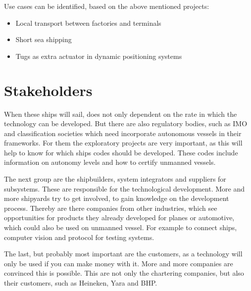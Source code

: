 Use cases can be identified, based on the above mentioned projects:
\begin{itemize}
	\item Local transport between factories and terminals
	\item Short sea shipping
	\item Tugs as extra actuator in dynamic positioning systems
\end{itemize}

\section{Stakeholders}
When these ships will sail, does not only dependent on the rate in which the technology can be developed. But there are also regulatory bodies, such as \ac{IMO} and classification societies which need incorporate autonomous vessels in their frameworks. 
For them the exploratory projects are very important, as this will help to know for which ships codes should be developed. These codes include information on autonomy levels and how to certify unmanned vessels.

The next group are the shipbuilders, system integrators and suppliers for subsystems. These are responsible for the technological development. More and more shipyards try to get involved, to gain knowledge on the development process. 
Thereby are there companies from other industries, which see opportunities for products they already developed for planes or automotive, which could also be used on unmanned vessel. For example to connect ships, computer vision and protocol for testing systems.

The last, but probably most important are the customers, as a technology will only be used if you can make money with it. More and more companies are convinced this is possible. This are not only the chartering companies, but also their customers, such as Heineken, Yara and BHP.

